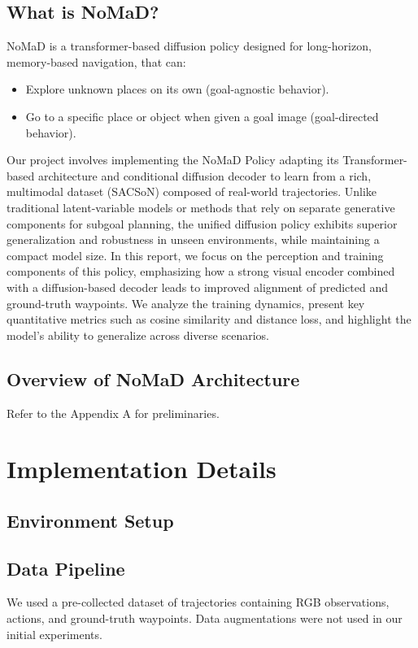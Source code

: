 \documentclass[12pt]{article}
\begin{document}
\subsection*{What is NoMaD?}
NoMaD is a transformer-based diffusion policy designed for long-horizon, memory-based navigation, that can:
\begin{itemize}
    \item Explore unknown places on its own (goal-agnostic behavior).
    \item Go to a specific place or object when given a goal image (goal-directed behavior).
\end{itemize}
Our project involves implementing the NoMaD Policy adapting its Transformer-based architecture and conditional diffusion decoder
to learn from a rich, multimodal dataset (SACSoN) composed of real-world trajectories.
Unlike traditional latent-variable models or methods that rely on separate generative components for subgoal planning, the unified diffusion policy exhibits superior generalization and robustness in unseen environments, while maintaining a compact model size.
In this report, we focus on the perception and training components of this policy, emphasizing how a strong visual encoder combined with a diffusion-based decoder leads to improved alignment of predicted and ground-truth waypoints. We analyze the training dynamics, present key quantitative metrics such as cosine similarity and distance loss, and highlight the model’s ability to generalize across diverse scenarios.

\subsection*{Overview of NoMaD Architecture}
Refer to the Appendix A for preliminaries.

\section{Implementation Details}
\subsection{Environment Setup}

\subsection{Data Pipeline}
We used a pre-collected dataset of trajectories containing RGB observations, actions, and ground-truth waypoints. Data augmentations were not used in our initial experiments.
\end{document}
